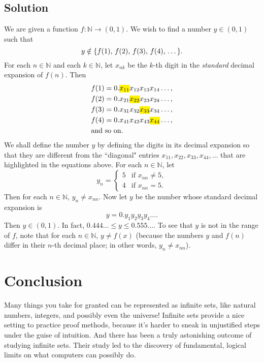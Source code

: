 \documentclass{article}
\begin{document}
\subsection*{Solution}
    We are given a function $f: \mathbb{N} \rightarrow (0, 1)$. We wish to find a number $y \in (0, 1)$ such that $$y \notin \{\text{$f(1)$, $f(2)$, $f(3)$, $f(4)$, \dots}\}.$$ For each $n \in \mathbb{N}$ and each $k \in \mathbb{N}$, let $x_{nk}$ be the $k$-th digit in the \textit{standard} decimal expansion of $f(n)$. Then 
    \begin{align*}
        &f(1) = 0.\text{\hl{$x_{11}$}}x_{12}x_{13}x_{14}\dots, \\
        &f(2) = 0.x_{21}\text{\hl{$x_{22}$}}x_{23}x_{24}\dots, \\
        &f(3) = 0.x_{31}x_{32}\text{\hl{$x_{33}$}}x_{34}\dots, \\
        &f(4) = 0.x_{41}x_{42}x_{43}\text{\hl{$x_{44}$}}\dots, \\
        &\text{and so on}.
    \end{align*}
    We shall define the number $y$ by defining the digits in its decimal expansion so that they are different from the ``diagonal" entries $x_{11}, x_{22}, x_{33}, x_{44}, \dots$ that are highlighted in the equations above. For each $n \in \mathbb{N}$, let
    $$y_n = 
    \begin{cases}
        5 & \text{if } x_{nn} \ne 5, \\
        4 & \text{if } x_{nn} = 5.
    \end{cases}$$
    Then for each $n \in \mathbb{N}$, $y_n \ne x_{nn}$. Now let $y$ be the number whose standard decimal expansion is $$y = 0.y_1y_2y_3y_4 \dots.$$ Then $y \in (0, 1)$. In fact, $0.444 \ldots \le y \le 0.555 \dots$. To see that $y$ is not in the range of $f$, note that for each $n \in \mathbb{N}$, $y \ne f(x)$ (because the numbers $y$ and $f(n)$ differ in their $n$-th decimal place; in other words, $y_n \ne x_{nn}$).

    \section*{Conclusion}

    \vspace{1mm}
    \qquad Many things you take for granted can be represented as infinite sets, like natural numbers, integers, and possibly even the universe! Infinite sets provide a nice setting to practice proof methods, because it’s harder to sneak in unjustified steps under the guise of intuition. And there has been a truly astonishing outcome of studying infinite sets. Their study led to the discovery of fundamental, logical limits on what computers can possibly do.
    
\end{document}
